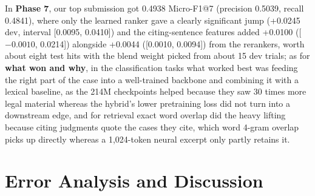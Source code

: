 \documentclass[11pt, oneside]{article}
\begin{document}
In \textbf{Phase 7}, our top submission got 0.4938 Micro-F1@7 (precision 0.5039, recall 0.4841), where only the learned ranker gave a clearly significant jump (+0.0245 dev, interval [0.0095, 0.0410]) and the citing-sentence features added +0.0100 ([$-0.0010$, 0.0214]) alongside +0.0044 ([0.0010, 0.0094]) from the rerankers, worth about eight test hits with the blend weight picked from about 15 dev trials; as for \textbf{what won and why}, in the classification tasks what worked best was feeding the right part of the case into a well-trained backbone and combining it with a lexical baseline, as the 214M checkpoints helped because they saw 30 times more legal material whereas the hybrid's lower pretraining loss did not turn into a downstream edge, and for retrieval exact word overlap did the heavy lifting because citing judgments quote the cases they cite, which word 4-gram overlap picks up directly whereas a 1,024-token neural excerpt only partly retains it.
\section{Error Analysis and Discussion}\label{sec:errors}
\end{document}
